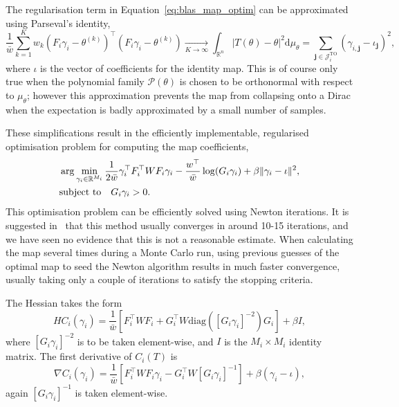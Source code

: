 \documentclass[final]{siamltex}
\begin{document}
The regularisation term in Equation~\eqref{eq:blas_map_optim} can be approximated using Parseval's identity,
\[
	\frac{1}{\bar{w}}\sum\limits_{k=1}^K \! w_k
        (F_i\gamma_i-\theta^{(k)})^\top(F_i\gamma_i-\theta^{(k)})
        \xrightarrow[K \to \infty]{}
		\int_{\mathbb{R}^n} |T(\theta)-\theta|^2 \text{d}\mu_\theta =
		\sum\limits_{\mathbf{j}\in\mathcal{J}_i^\text{TO}} (\gamma_{i,\mathbf{j}}-\iota_\mathbf{j})^2,
\]
where $\iota$ is the vector of coefficients for the identity map. This is of course only true when
the polynomial family $\mathcal{P}(\theta)$ is chosen to be orthonormal with respect to $\mu_\theta$; however this
approximation prevents the map from collapsing onto a Dirac when the expectation is badly approximated by a small number of samples.%

These simplifications result in the efficiently implementable, regularised optimisation problem for
computing the map coefficients, 
\begin{align}\label{eq:weighted_map_optim}
	&\arg\min_{\gamma_i\in\mathbb{R}^{M_i}} \frac{1}{2\bar{w}}\gamma_i^\top F_i^\top WF_i\gamma_i -
		\frac{w^\top}{\bar{w}}\log(G_i\gamma_i) + \beta\|\gamma_i-\iota\|^2, \\
	&\text{subject to} \quad G_i\gamma_i > 0. \notag
\end{align}
This optimisation problem can be efficiently solved using Newton iterations. It is suggested
in~\cite{parno2014transport} that this method usually converges in around 10-15 iterations, and we
have seen no evidence that this is not a reasonable estimate. When calculating the map several times
during a Monte Carlo run, using previous guesses of the optimal map to seed the Newton algorithm
results in much faster convergence, usually taking only a couple of iterations to satisfy the stopping
criteria.

The Hessian takes the
form
\begin{equation}\label{eqn:TETAIS_hessian}
	HC_i(\gamma_i) = \frac{1}{\bar{w}}\left[F_i^\top WF_i + G_i^\top
		W\text{diag}([G_i\gamma_i]^{-2})G_i\right] + \beta I,
\end{equation}
where $[G_i\gamma_i]^{-2}$ is to be taken element-wise, and $I$ is the $M_i\times M_i$
identity matrix. The first derivative of $C_i(T)$ is
\[
	\nabla C_i(\gamma_i) = \frac{1}{\bar{w}}\left[F_i^\top WF_i\gamma_i - G_i^\top
		W[G_i\gamma_i]^{-1}\right] + \beta(\gamma_i - \iota),
\]
again $[G_i\gamma_i]^{-1}$ is taken element-wise.
\end{document}
